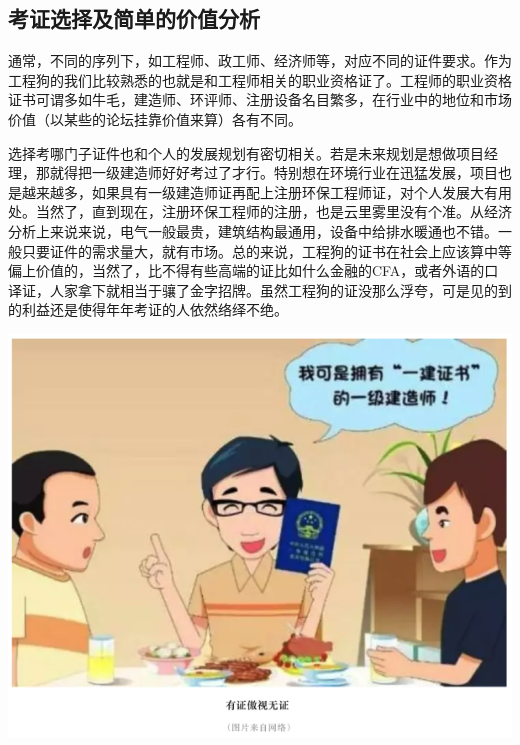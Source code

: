 \documentclass[]{book}
\begin{document}
\hypertarget{ux8003ux8bc1ux9009ux62e9ux53caux7b80ux5355ux7684ux4ef7ux503cux5206ux6790}{%
\subsection{考证选择及简单的价值分析}\label{ux8003ux8bc1ux9009ux62e9ux53caux7b80ux5355ux7684ux4ef7ux503cux5206ux6790}}

通常，不同的序列下，如工程师、政工师、经济师等，对应不同的证件要求。作为工程狗的我们比较熟悉的也就是和工程师相关的职业资格证了。工程师的职业资格证书可谓多如牛毛，建造师、环评师、注册设备名目繁多，在行业中的地位和市场价值（以某些的论坛挂靠价值来算）各有不同。

选择考哪门子证件也和个人的发展规划有密切相关。若是未来规划是想做项目经理，那就得把一级建造师好好考过了才行。特别想在环境行业在迅猛发展，项目也是越来越多，如果具有一级建造师证再配上注册环保工程师证，对个人发展大有用处。当然了，直到现在，注册环保工程师的注册，也是云里雾里没有个准。从经济分析上来说来说，电气一般最贵，建筑结构最通用，设备中给排水暖通也不错。一般只要证件的需求量大，就有市场。总的来说，工程狗的证书在社会上应该算中等偏上价值的，当然了，比不得有些高端的证比如什么金融的CFA，或者外语的口译证，人家拿下就相当于骧了金字招牌。虽然工程狗的证没那么浮夸，可是见的到的利益还是使得年年考证的人依然络绎不绝。

\includegraphics[width=8.33in]{images/kaozheng2}
\end{document}
